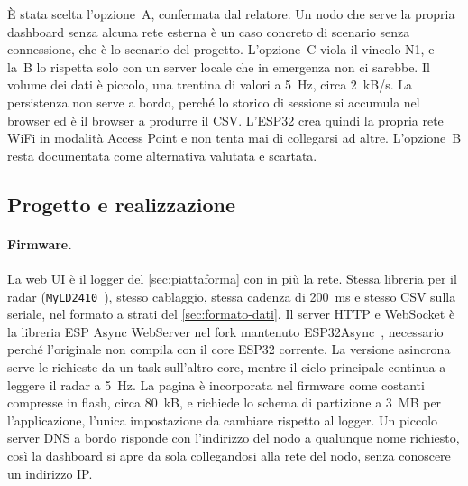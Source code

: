 È stata scelta l'opzione~A, confermata dal relatore. Un nodo che serve la propria
dashboard senza alcuna rete esterna è un caso concreto di scenario senza
connessione, che è lo scenario del progetto. L'opzione~C viola il vincolo N1, e la~B
lo rispetta solo con un server locale che in emergenza non ci sarebbe. Il volume dei
dati è piccolo, una trentina di valori a 5~Hz, circa 2~kB/s. La persistenza non
serve a bordo, perché lo storico di sessione si accumula nel browser ed è il browser
a produrre il CSV. L'ESP32 crea quindi la propria rete WiFi in modalità Access Point
e non tenta mai di collegarsi ad altre. L'opzione~B resta documentata come
alternativa valutata e scartata.

\subsection{Progetto e realizzazione}
\label{sec:webui-progetto}
\label{sec:webui-piano}
\label{sec:webui-lezioni}
\label{sec:webui-riferimenti}

\paragraph{Firmware.} La web UI è il logger del \cref{sec:piattaforma} con in più la
rete. Stessa libreria per il radar (\texttt{MyLD2410}~\cite{myld2410}), stesso
cablaggio, stessa cadenza di 200~ms e stesso CSV sulla seriale, nel formato a strati
del \cref{sec:formato-dati}. Il server HTTP e WebSocket è la libreria ESP Async
WebServer nel fork mantenuto ESP32Async~\cite{esp32async}, necessario perché
l'originale non compila con il core ESP32 corrente. La versione asincrona serve le
richieste da un task sull'altro core, mentre il ciclo principale continua a leggere
il radar a 5~Hz. La pagina è incorporata nel firmware come costanti compresse in
flash, circa 80~kB, e richiede lo schema di partizione a 3~MB per l'applicazione,
l'unica impostazione da cambiare rispetto al logger. Un piccolo server DNS a bordo
risponde con l'indirizzo del nodo a qualunque nome richiesto, così la dashboard si
apre da sola collegandosi alla rete del nodo, senza conoscere un indirizzo IP.

